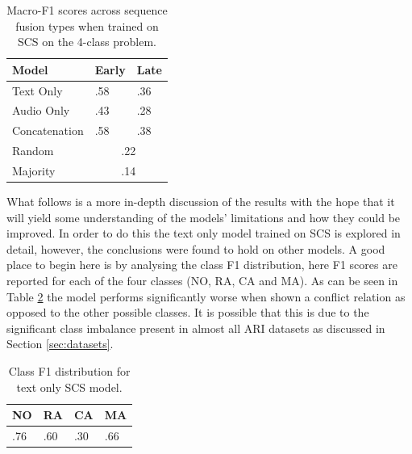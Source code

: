 \documentclass[twocolumn,twoside]{article}
\begin{document}
\begin{table}[h]
\centering
\caption{Macro-F1 scores across sequence fusion types when trained on SCS on the 4-class problem. \label{tbl:results-seq-4class}}
\begin{tabular}{|l|ll|}
\hline
Model         & Early       & Late      \\ \hline
Text Only     & .58         & .36       \\
Audio Only    & .43         & .28       \\
Concatenation & .58         & .38       \\ \hline
Random        & \multicolumn{2}{c|}{.22} \\
Majority      & \multicolumn{2}{c|}{.14} \\ \hline
\end{tabular}
\end{table}

What follows is a more in-depth discussion of the results with the hope
that it will yield some understanding of the models' limitations and how
they could be improved. In order to do this the text only model trained
on SCS is explored in detail, however, the conclusions were found to
hold on other models. A good place to begin here is by analysing the
class F1 distribution, here F1 scores are reported for each of the four
classes (NO, RA, CA and MA). As can be seen in Table
\ref{tbl:class-f1-4class} the model performs significantly worse when
shown a conflict relation as opposed to the other possible classes. It
is possible that this is due to the significant class imbalance present
in almost all ARI datasets as discussed in Section \ref{sec:datasets}.

\begin{table}[h]
\centering
\caption{Class F1 distribution for text only SCS model.\label{tbl:class-f1-4class}}
\begin{tabular}{|llll|}
\hline
NO & RA & CA & MA              \\ \hline
.76         & .60         & .30         & .66 \\ \hline
\end{tabular}
\end{table}
\end{document}
